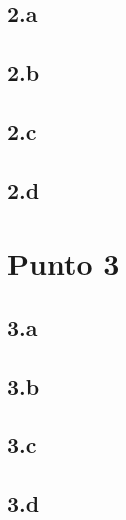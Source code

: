 \documentclass[a4paper,11pt]{article}
\begin{document}
\subsection*{2.a}
\subsection*{2.b}
\subsection*{2.c}  
\subsection*{2.d}

\section*{Punto 3}
\subsection*{3.a}
\subsection*{3.b}
\subsection*{3.c}  
\subsection*{3.d}
\end{document}
